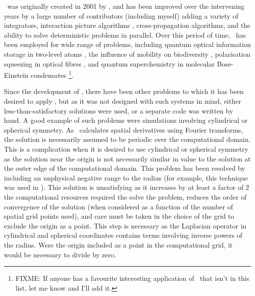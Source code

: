 \parasep

\XMDS\ was originally created in 2001 by \citet{Collecutt:2001}, and has been improved over the intervening years by a large number of contributors (including myself) adding a variety of integrators, interaction picture algorithms \citep{Caradoc-Davies:2000qy}, cross-propagation algorithms, and the ability to solve deterministic problems in parallel.  Over this period of time, \XMDS\ has been employed for wide range of problems, including quantum optical information storage in two-level atoms \citep{Hetet:2008}, the influence of mobility on biodiversity \citep{Reichenbach:2007}, polarisation squeezing in optical fibres \citep{Corney:2006}, and quantum superchemistry in molecular Bose-Einstein condensates \citep{Hope:2001a}\footnote{FIXME: If anyone has a favourite interesting application of \XMDS\ that isn't in this list, let me know and I'll add it.}.  

Since the development of \XMDS, there have been other problems to which it has been desired to apply \XMDS, but as it was not designed with such systems in mind, either less-than-satisfactory solutions were used, or a separate code was written by hand.  A good example of such problems were simulations involving cylindrical or spherical symmetry.  As \XMDS\ calculates spatial derivatives using Fourier transforms, the solution is necessarily assumed to be periodic over the computational domain.  This is a complication when it is desired to use cylindrical or spherical symmetry as the solution near the origin is not necessarily similar in value to the solution at the outer edge of the computational domain.  This problem has been resolved by including an unphysical negative range to the radius (for example, this technique was used in \citep{Wuster:2005,Dall:2009}).  This solution is unsatisfying as it increases by at least a factor of 2 the computational resources required the solve the problem, reduces the order of convergence of the solution (when considered as a function of the number of spatial grid points used), and care must be taken in the choice of the grid to exclude the origin as a point.  This step is necessary as the Laplacian operator in cylindrical and spherical coordinates contains terms involving inverse powers of the radius.  Were the origin included as a point in the computational grid, it would be necessary to divide by zero.


